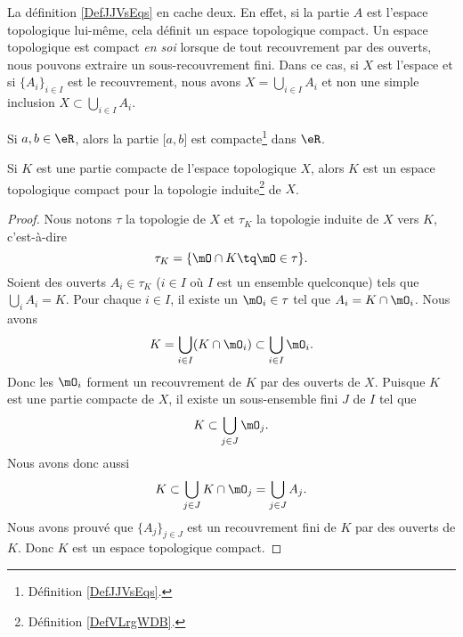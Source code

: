 \begin{normaltext}
	La définition \ref{DefJJVsEqs} en cache deux. En effet, si la partie \( A\) est l'espace topologique lui-même, cela définit un espace topologique compact. Un espace topologique est compact \emph{en soi} lorsque de tout recouvrement par des ouverts, nous pouvons extraire un sous-recouvrement fini. Dans ce cas, si \( X\) est l'espace et si \( \{ A_i \}_{i\in I}\) est le recouvrement, nous avons \( X=\bigcup_{i\in I}A_i\) et non une simple inclusion \( X\subset \bigcup_{i\in I}A_i\).
\end{normaltext}

\begin{lemma}       \label{LEMooNNHYooITNbyz}
	Si \( a,b\in \eR\), alors la partie \( \mathopen[ a , b \mathclose]\) est compacte\footnote{Définition \ref{DefJJVsEqs}.} dans \( \eR\).
\end{lemma}

\begin{lemma}       \label{LEMooVYTRooKTIYdn}
	Si \( K\) est une partie compacte de l'espace topologique \( X\), alors \( K\) est un espace topologique compact pour la topologie induite\footnote{Définition \ref{DefVLrgWDB}.} de \( X\).
\end{lemma}

\begin{proof}
	Nous notons \( \tau\) la topologie de \( X\) et \( \tau_K\) la topologie induite de \( X\) vers \( K\), c'est-à-dire
	\begin{equation}
		\tau_K=\{ \mO\cap K\tq \mO\in\tau \}.
	\end{equation}
	Soient des ouverts \( A_i\in \tau_K\) (\( i\in I\) où \( I\) est un ensemble quelconque) tels que \( \bigcup_iA_i=K\). Pour chaque \( i\in I\), il existe un \( \mO_i\in \tau\) tel que \( A_i=K\cap\mO_i\). Nous avons
	\begin{equation}
		K=\bigcup_{i\in I}(K\cap\mO_i)\subset\bigcup_{i\in I}\mO_i.
	\end{equation}
	Donc les \( \mO_i\) forment un recouvrement de \( K\) par des ouverts de \( X\). Puisque \( K\) est une partie compacte de \( X\), il existe un sous-ensemble fini \( J\) de \( I\) tel que
	\begin{equation}
		K\subset\bigcup_{j\in J}\mO_j.
	\end{equation}
	Nous avons donc aussi
	\begin{equation}
		K\subset\bigcup_{j\in J}K\cap\mO_j=\bigcup_{j\in J}A_j.
	\end{equation}
	Nous avons prouvé que \( \{ A_j \}_{j\in J}\) est un recouvrement fini de \( K\) par des ouverts de \( K\). Donc \( K\) est un espace topologique compact.
\end{proof}


